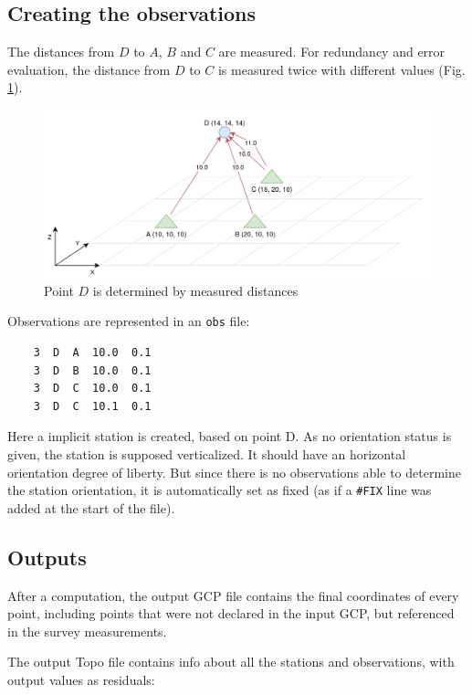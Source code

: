\subsection{Creating the observations}

The distances from $D$ to $A$, $B$ and $C$
are measured. For redundancy and error evaluation, the distance from $D$ to $C$ is measured twice
with different values (Fig. \ref{fig:topoEx2}).

\begin{figure}[!h]
\centering
\includegraphics[width=12cm]{Programmer/benchtopo2.png}
\caption{Point $D$ is determined by measured distances}
\label{fig:topoEx2}
\end{figure}

Observations are represented in an {\tt obs} file:
\begin{lstlisting}
    3  D  A  10.0  0.1
    3  D  B  10.0  0.1
    3  D  C  10.0  0.1
    3  D  C  10.1  0.1
\end{lstlisting}

Here a implicit station is created, based on point D.
As no orientation status is given, the station is supposed verticalized.
It should have an horizontal orientation degree of liberty.
But since there is no observations able to determine the station orientation,
it is automatically set as fixed (as if a {\tt \#FIX} line was added at the start of the file).

\subsection{Outputs}

After a computation, the output GCP file contains the final coordinates of every point, including
points that were not declared in the input GCP, but referenced in the survey measurements.

The output Topo file contains info about all the stations and observations,
with output values as residuals:

